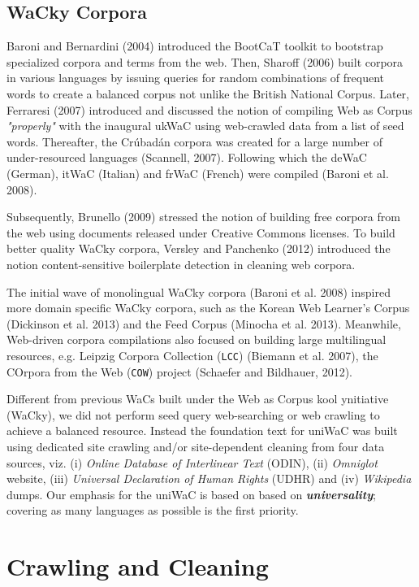 \documentclass[11pt]{article}
\begin{document}
\subsection{WaCky Corpora}

Baroni and Bernardini (2004) introduced the BootCaT toolkit to bootstrap specialized corpora and terms from the web. Then, Sharoff (2006) built corpora in various languages by issuing queries for random combinations of frequent words to create a balanced corpus not unlike the British National Corpus. Later, Ferraresi (2007) introduced and discussed the notion of compiling Web as Corpus \emph{"properly"} with the inaugural ukWaC using web-crawled data from a list of seed words. Thereafter, the Crúbadán corpora was created for a large number of under-resourced languages (Scannell, 2007). Following which the deWaC (German), itWaC (Italian) and frWaC (French) were compiled (Baroni et al. 2008). 

Subsequently, Brunello (2009) stressed the notion of building free corpora from the web using documents released under Creative Commons licenses. To build better quality WaCky corpora, Versley and Panchenko (2012) introduced the notion content-sensitive boilerplate detection in cleaning web corpora. 

The initial wave of monolingual WaCky corpora (Baroni et al. 2008) inspired more domain specific WaCky corpora, such as the Korean Web Learner's Corpus (Dickinson et al. 2013) and the Feed Corpus (Minocha et al. 2013). Meanwhile, Web-driven corpora compilations also focused on building large  multilingual resources, e.g. Leipzig Corpora Collection (\texttt{LCC}) (Biemann et al. 2007), the COrpora from the Web (\texttt{COW}) project (Schaefer and Bildhauer, 2012).

Different from previous WaCs built under the Web as Corpus kool ynitiative (WaCky), we did not perform seed query web-searching or web crawling to achieve a balanced resource. Instead the foundation text for uniWaC was built using dedicated site crawling and/or site-dependent cleaning from four data sources, viz. (i) \emph{Online Database of Interlinear Text} (ODIN), (ii) \emph{Omniglot} website, (iii) \emph{Universal Declaration of Human Rights} (UDHR) and (iv) \emph{Wikipedia} dumps. Our emphasis for the uniWaC is based on based on \textbf{\emph{universality}}; covering as many languages as possible is the first priority.


\section{Crawling and Cleaning}
\end{document}

